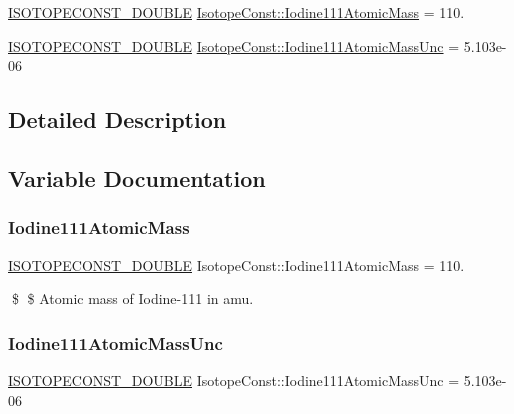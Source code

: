\begin{DoxyCompactItemize}
\item 
\mbox{\hyperlink{group___isotope_const-_macros_ga8f45a7272ce02c0b4c65c44636ed719a}{I\+S\+O\+T\+O\+P\+E\+C\+O\+N\+S\+T\+\_\+\+D\+O\+U\+B\+LE}} \mbox{\hyperlink{group___isotope_const-_iodine-_i111_ga3c69330c2ea2f66eb572b60b4df4da3c}{Isotope\+Const\+::\+Iodine111\+Atomic\+Mass}} = 110.
\item 
\mbox{\hyperlink{group___isotope_const-_macros_ga8f45a7272ce02c0b4c65c44636ed719a}{I\+S\+O\+T\+O\+P\+E\+C\+O\+N\+S\+T\+\_\+\+D\+O\+U\+B\+LE}} \mbox{\hyperlink{group___isotope_const-_iodine-_i111_ga6d154e9e54a514b0bc32048dcb2a9900}{Isotope\+Const\+::\+Iodine111\+Atomic\+Mass\+Unc}} = 5.\+103e-\/06
\end{DoxyCompactItemize}


\subsection{Detailed Description}


\subsection{Variable Documentation}
\mbox{\label{group___isotope_const-_iodine-_i111_ga3c69330c2ea2f66eb572b60b4df4da3c}} 
\subsubsection{\texorpdfstring{Iodine111\+Atomic\+Mass}{Iodine111AtomicMass}}
{\footnotesize\ttfamily \mbox{\hyperlink{group___isotope_const-_macros_ga8f45a7272ce02c0b4c65c44636ed719a}{I\+S\+O\+T\+O\+P\+E\+C\+O\+N\+S\+T\+\_\+\+D\+O\+U\+B\+LE}} Isotope\+Const\+::\+Iodine111\+Atomic\+Mass = 110.}

\$ \$ Atomic mass of Iodine-\/111 in amu. \mbox{\label{group___isotope_const-_iodine-_i111_ga6d154e9e54a514b0bc32048dcb2a9900}} 
\subsubsection{\texorpdfstring{Iodine111\+Atomic\+Mass\+Unc}{Iodine111AtomicMassUnc}}
{\footnotesize\ttfamily \mbox{\hyperlink{group___isotope_const-_macros_ga8f45a7272ce02c0b4c65c44636ed719a}{I\+S\+O\+T\+O\+P\+E\+C\+O\+N\+S\+T\+\_\+\+D\+O\+U\+B\+LE}} Isotope\+Const\+::\+Iodine111\+Atomic\+Mass\+Unc = 5.\+103e-\/06}

